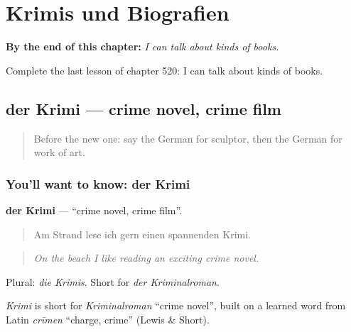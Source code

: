 
\chapter{Krimis und Biografien}
\label{ch:ge-krimis-und-biografien}

\begin{chapteropening}
\textbf{By the end of this chapter:} \emph{I can talk about kinds of books.}

Complete the last lesson of chapter 520: I can talk about kinds of books.
\end{chapteropening}

\section[der Krimi]{der Krimi — crime novel, crime film}

\label{lesson:GE-C520-krimi}



\begin{quote}
Before the new one: say the German for sculptor, then the German for work of art.
\end{quote}

\subsection*{You'll want to know: der Krimi}
\textbf{der Krimi} — \textquotedblleft{}crime novel, crime film\textquotedblright{}.

\begin{quote}
Am Strand lese ich gern einen spannenden Krimi.
\end{quote}

\begin{quote}
\emph{On the beach I like reading an exciting crime novel.}
\end{quote}

Plural: \emph{die Krimis}. Short for \emph{der Kriminalroman}.

\begin{cousinweb}
\emph{Krimi} is short for \emph{Kriminalroman} \textquotedblleft{}crime novel\textquotedblright{}, built on a learned word from Latin \emph{crīmen} \textquotedblleft{}charge, crime\textquotedblright{} (Lewis \& Short).
\end{cousinweb}


